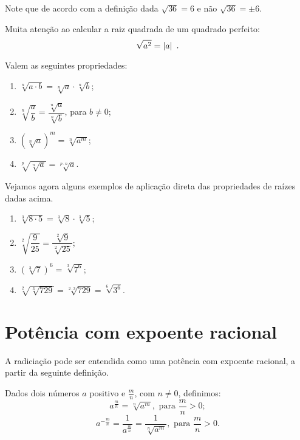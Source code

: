\begin{obs}
 Note que de acordo com a definição dada $\sqrt{36}= 6$ e não $\sqrt{36}= \pm 6$.
 \end{obs}

 Muita atenção ao calcular a raiz quadrada de um quadrado perfeito:
\begin{equation*}
\sqrt{a^2}= \left|a\right| \ . 
\end{equation*}

 Valem as seguintes propriedades:
 \begin{enumerate}[R1)]
 \item $\sqrt[n]{a \cdot b}= \sqrt[n]{a} \cdot \sqrt[n]{b}$;
 \item $\sqrt[n]{\dfrac{a}{b}}= \dfrac{\sqrt[n]{a}}{\sqrt[n]{b}}$, para $b \neq 0$;
 \item $(\sqrt[n]{a})^m= \sqrt[n]{a^m}$;
 \item $\sqrt[p]{\sqrt[n]{a}}= \sqrt[p \cdot n]{a}$.
 \end{enumerate}

 \begin{exem} Vejamos agora alguns exemplos de aplicação direta das propriedades de raízes dadas acima.
\begin{enumerate}[R1)]
 \item $\sqrt[3]{8 \cdot 5}= \sqrt[3]{8} \cdot \sqrt[3]{5}$;
 \item $\sqrt[2]{\dfrac{9}{25}}= \dfrac{\sqrt[2]{9}}{\sqrt[2]{25}}$;
 \item $\left(\sqrt[3]{7}\right)^6= \sqrt[3]{7^6}$;
 \item $\sqrt[2]{\sqrt[3]{729}}= \sqrt[2 \cdot 3]{729}= \sqrt[6]{3^6}$.
  \end{enumerate}
\end{exem}


 \section{Potência com expoente racional}

 A radiciação pode ser entendida como uma potência com expoente racional, a partir da seguinte definição.
 
\begin{obs}
  Dados dois números $a$ positivo e $\frac{m}{n}$, com $n\neq 0$, definimos:
\begin{equation*}
a^{\frac{m}{n}}= \sqrt[n]{a^m}, \text{ para } \frac{m}{n} >0 ;
\end{equation*}
\begin{equation*}
a^{-\frac{m}{n}}= \frac{1}{a^{\frac{m}{n}}}= \frac{1}{\sqrt[n]{a^m}},  \text{ para } \frac{m}{n} >0.
\end{equation*}
\end{obs}

